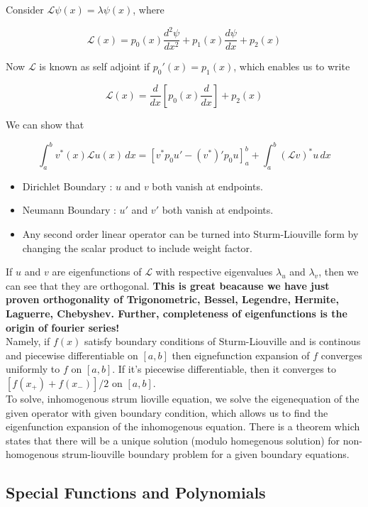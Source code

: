 \documentclass{report}
\begin{document}
\noindent Consider $\mathcal{L}\psi(x) = \lambda\psi(x)$, where

$$\mathcal{L}(x) = p_0(x)\frac{d^2 \psi}{dx^2} + p_1(x)\frac{d\psi}{dx} + p_2(x)$$

\noindent Now $\mathcal{L}$ is known as self adjoint if $p_0'(x) = p_1(x)$, which enables us to write 

$$\mathcal{L}(x) = \frac{d}{dx}\left[p_0(x)\frac{d}{dx}\right]+p_2(x)$$

\noindent We can show that

$$\int_{a}^{b}v^*(x)\mathcal{L}u(x)\,dx = \left[v^* p_0 u' - (v^*)'p_0 u\right]_{a}^{b} + \int_{a}^{b}(\mathcal{L}v)^* u \,dx$$

\begin{itemize}
  \item Dirichlet Boundary : $u$ and $v$ both vanish at endpoints.
  \item Neumann Boundary : $u'$ and $v'$ both vanish at endpoints.
  \item Any second order linear operator can be turned into Sturm-Liouville form by changing the scalar product to include weight factor.
\end{itemize}

\noindent If $u$ and $v$ are eigenfunctions of $\mathcal{L}$ with respective eigenvalues $\lambda_u$ and $\lambda_v$, then we can see that they are orthogonal. \textbf{This is great beacause we have just proven orthogonality of Trigonometric, Bessel, Legendre, Hermite, Laguerre, Chebyshev. Further, completeness of eigenfunctions is the origin of fourier series!}\\

\noindent Namely, if $f(x)$ satisfy boundary conditions of Sturm-Liouville and is continous and piecewise differentiable on $[a,b]$ then eignefunction expansion of $f$ converges uniformly to $f$ on $[a,b]$. If it's piecewise differentiable, then it converges to $[f(x_+) + f(x_-)]/2$ on $[a,b]$.\\

\noindent To solve, inhomogenous strum lioville equation, we solve the eigenequation of the given operator with given boundary condition, which allows us to find the eigenfunction expansion of the inhomogenous equation. There is a theorem which states that there will be a unique solution (modulo homegenous solution) for non-homogenous strum-liouville boundary problem for a given boundary equations.

\subsection{Special Functions and Polynomials}
\end{document}
